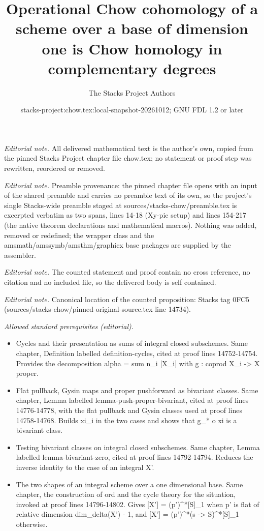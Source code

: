 \documentclass[10pt,a4paper]{amsart}
\title{Operational Chow cohomology of a scheme over a base of dimension one is Chow homology in complementary degrees}
\author{The Stacks Project Authors}
\date{stacks-project:chow.tex:local-snapshot-20261012; GNU FDL 1.2 or later}
\theoremstyle{plain}
\theoremstyle{definition}
\theoremstyle{remark}
\numberwithin{equation}{subsection}
\begin{document}
\maketitle
\noindent\textit{Editorial note.} All delivered mathematical text is the author's own, copied from the pinned Stacks Project chapter file chow.tex; no statement or proof step was rewritten, reordered or removed.\par\medskip
\noindent\textit{Editorial note.} Preamble provenance: the pinned chapter file opens with an input of the shared preamble and carries no preamble text of its own, so the project's single Stacks-wide preamble staged at sources/stacks-chow/preamble.tex is excerpted verbatim as two spans, lines 14-18 (Xy-pic setup) and lines 154-217 (the native theorem declarations and mathematical macros). Nothing was added, removed or redefined; the wrapper class and the amsmath/amssymb/amsthm/graphicx base packages are supplied by the assembler.\par\medskip
\noindent\textit{Editorial note.} The counted statement and proof contain no cross reference, no citation and no included file, so the delivered body is self contained.\par\medskip
\noindent\textit{Editorial note.} Canonical location of the counted proposition: Stacks tag 0FC5 (sources/stacks-chow/pinned-original-source.tex line 14734).\par\medskip
\noindent\textit{Allowed standard prerequisites (editorial).}\begin{itemize}
\item Cycles and their presentation as sums of integral closed subschemes. Same chapter, Definition labelled definition-cycles, cited at proof lines 14752-14754. Provides the decomposition alpha = sum n\_i [X\_i] with g : coprod X\_i -> X proper.
\item Flat pullback, Gysin maps and proper pushforward as bivariant classes. Same chapter, Lemma labelled lemma-push-proper-bivariant, cited at proof lines 14776-14778, with the flat pullback and Gysin classes used at proof lines 14758-14768. Builds xi\_i in the two cases and shows that g\_* o xi is a bivariant class.
\item Testing bivariant classes on integral closed subschemes. Same chapter, Lemma labelled lemma-bivariant-zero, cited at proof lines 14792-14794. Reduces the inverse identity to the case of an integral X'.
\item The two shapes of an integral scheme over a one dimensional base. Same chapter, the construction of ord and the cycle theory for the situation, invoked at proof lines 14796-14802. Gives [X'] = (p')\textasciicircum{}*[S]\_1 when p' is flat of relative dimension dim\_delta(X') - 1, and [X'] = (p')\textasciicircum{}*(s -> S)\textasciicircum{}*[S]\_1 otherwise.
\end{itemize}\medskip
\end{document}
